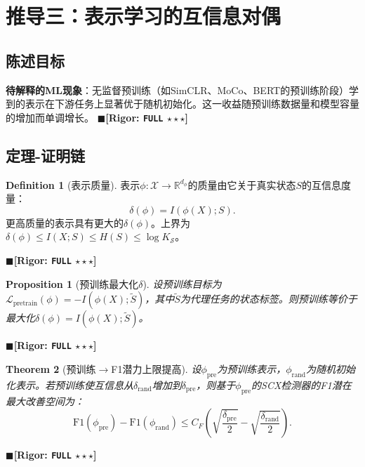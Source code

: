 \documentclass[12pt,a4paper]{ctexart}
\newtheorem{theorem}{Theorem}[section]
\newtheorem{proposition}[theorem]{Proposition}
\theoremstyle{definition}
\newtheorem{definition}{Definition}[section]
\theoremstyle{remark}
\newcommand{\rigorFull}{$\blacksquare$\;\textbf{[Rigor: \texttt{FULL} $\star\star\star$]}}
\begin{document}
\section{推导三：表示学习的互信息对偶}
\label{sec:representation}

\subsection{陈述目标}
\textbf{待解释的ML现象}：无监督预训练（如SimCLR、MoCo、BERT的预训练阶段）学到的表示在下游任务上显著优于随机初始化。这一收益随预训练数据量和模型容量的增加而单调增长。
\rigorFull

\subsection{定理-证明链}

\begin{definition}[表示质量]
表示$\phi: \mathcal{X} \to \mathbb{R}^{d_\phi}$的质量由它关于真实状态$S$的互信息度量：
\begin{equation}
\delta(\phi) = I(\phi(X); S).
\end{equation}
更高质量的表示具有更大的$\delta(\phi)$。上界为$\delta(\phi) \leq I(X; S) \leq H(S) \leq \log K_{\mathcal{S}}$。
\end{definition}
\rigorFull

\begin{proposition}[预训练最大化$\delta$]
\label{prop:7}
设预训练目标为$\mathcal{L}_{\text{pretrain}}(\phi) = -I(\phi(X); \tilde{S})$，其中$\tilde{S}$为代理任务的状态标签。则预训练等价于最大化$\delta(\phi) = I(\phi(X); \tilde{S})$。
\end{proposition}
\rigorFull

\begin{theorem}[预训练$\to$F1潜力上限提高]
\label{thm:4.1}
设$\phi_{\text{pre}}$为预训练表示，$\phi_{\text{rand}}$为随机初始化表示。若预训练使互信息从$\delta_{\text{rand}}$增加到$\delta_{\text{pre}}$，则基于$\phi_{\text{pre}}$的SCX检测器的F1潜在最大改善空间为：
\begin{equation}
\boxed{\mathrm{F1}(\phi_{\text{pre}}) - \mathrm{F1}(\phi_{\text{rand}}) \leq C_F\left(\sqrt{\frac{\delta_{\text{pre}}}{2}} - \sqrt{\frac{\delta_{\text{rand}}}{2}}\right)}.
\end{equation}
\end{theorem}
\rigorFull
\end{document}
